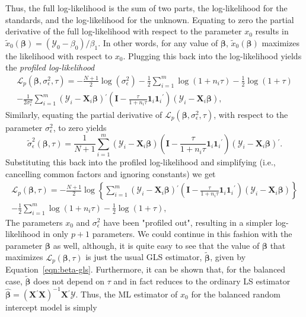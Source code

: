 \documentclass[cmfont,usenames,dvipsnames,leqno]{afit-etd}\usepackage[]{graphicx}\usepackage[]{color}
\newcommand{\loglik}{\mathscr{L}}
\newcommand{\trans}{\ensuremath{^\prime}}
\newcommand{\bc}[1]{\ensuremath{\bm{\mathcal{#1}}}}
\newcommand{\mc}[1]{\ensuremath{\mathcal{#1}}}
\newcommand{\wh}[1]{\ensuremath{\widehat{#1}}}
\newcommand{\X}{\ensuremath{\bm{X}}}
\begin{document}
Thus, the full log-likelihood is the sum of two parts, the log-likelihood for the standards, and the log-likelihood for the unknown. Equating to zero the partial derivative of the full log-likelihood with respect to the parameter $x_0$ results in $\widetilde{x}_0\left(\bm{\beta}\right) = \left(\mc{Y}_0 - \beta_0\right)/\beta_1$. In other words, for any value of $\bm{\beta}$, $\widetilde{x}_0\left(\bm{\beta}\right)$ maximizes the likelihood with respect to $x_0$. Plugging this back into the log-likelihood yields the \textit{profiled log-likelihood}
\begin{multline*}
  \loglik_p\left(\bm{\beta}, \sigma_\epsilon^2, \tau\right) = -\frac{N+1}{2}\log\left(\sigma_\epsilon^2\right) - \frac{1}{2}\sum_{i = 1}^m \log\left(1 + n_i\tau\right) - \frac{1}{2}\log\left(1 + \tau\right) \\ - \frac{1}{2\sigma_\epsilon^2}\sum_{i = 1}^m \left(\bc{Y}_i - \X_i\bm{\beta}\right)\trans\left(\bm{I} - \frac{\tau}{1 + n_i\tau}\bm{1}_i\bm{1}_i\trans\right)\left(\bc{Y}_i - \X_i\bm{\beta}\right),
\end{multline*}
Similarly, equating the partial derivative of $\loglik_p\left(\bm{\beta}, \sigma_\epsilon^2, \tau\right)$, with respect to the parameter $\sigma_\epsilon^2$, to zero yields 
\begin{equation*}
  \widetilde{\sigma}_\epsilon^2\left(\bm{\beta}, \tau\right) = \frac{1}{N + 1}\sum_{i = 1}^m \left(\bc{Y}_i - \X_i\bm{\beta}\right)\left(\bm{I} - \frac{\tau}{1 + n_i\tau}\bm{1}_i\bm{1}_i\trans\right)\left(\bc{Y}_i - \X_i\bm{\beta}\right)\trans.
\end{equation*}
Substituting this back into the profiled log-likelihood and simplifying (i.e., cancelling common factors and ignoring constants) we get
\begin{multline*}
  \loglik_p\left(\bm{\beta}, \tau\right) = -\frac{N+1}{2}\log\left\{\sum_{i = 1}^m \left(\bc{Y}_i - \X_i\bm{\beta}\right)\trans\left(\bm{I} - \frac{\tau}{1 + n_i\tau}\bm{1}_i\bm{1}_i\trans\right)\left(\bc{Y}_i - \X_i\bm{\beta}\right)\right\} \\ - \frac{1}{2}\sum_{i = 1}^m \log\left(1 + n_i\tau\right) - \frac{1}{2}\log\left(1 + \tau\right),
\end{multline*}
The parameters $x_0$ and $\sigma_\epsilon^2$ have been "profiled out", resulting in a simpler log-likelihood in only $p + 1$ parameters. We could continue in this fashion with the parameter $\bm{\beta}$ as well, although, it is quite easy to see that the value of $\bm{\beta}$ that maximizes $\loglik_p\left(\bm{\beta}, \tau\right)$ is just the usual \ac{GLS} estimator, $\widetilde{\bm{\beta}}$, given by Equation~\eqref{eqn:beta-gls}. Furthermore, it can be shown \citep{demidenko_mixed_2013} that, for the balanced case, $\widetilde{\bm{\beta}}$ does not depend on $\tau$ and in fact reduces to the ordinary \ac{LS} estimator $\wh{\bm{\beta}} = \left(\X\trans\X\right)^{-1}\X\trans\bc{Y}$. Thus, the \ac{ML} estimator of $x_0$ for the balanced random intercept model is simply
\end{document}
